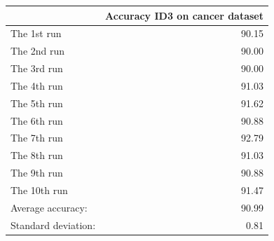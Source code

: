 \begin{tabular}{lr}
\toprule
{} &  Accuracy ID3 on cancer dataset \\
\midrule
The 1st run         &                           90.15 \\
The 2nd run         &                           90.00 \\
The 3rd run         &                           90.00 \\
The 4th run         &                           91.03 \\
The 5th run         &                           91.62 \\
The 6th run         &                           90.88 \\
The 7th run         &                           92.79 \\
The 8th run         &                           91.03 \\
The 9th run         &                           90.88 \\
The 10th run        &                           91.47 \\
Average accuracy:   &                           90.99 \\
Standard deviation: &                            0.81 \\
\bottomrule
\end{tabular}
